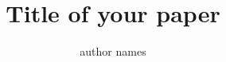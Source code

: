 \documentclass[dvipdfm,11pt]{article}
\begin{document}

\title{Title of your paper}

\author{author names}

\maketitle

\begin{abstract}


\end{abstract}















\begin{thebibliography}{10}
\itemsep=1pt
\begin{small}
%



\end{small}
\end{thebibliography}
\end{document}
